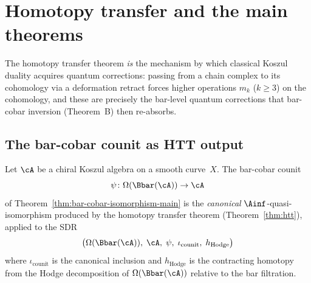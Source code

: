 \section{Homotopy transfer and the main theorems}
\label{sec:htt-main-theorems}

The homotopy transfer theorem \emph{is} the mechanism by which classical Koszul duality
acquires quantum corrections: passing from a chain complex to its cohomology via a
deformation retract forces higher operations $m_k$ ($k \geq 3$) on the cohomology,
and these are precisely the bar-level quantum corrections that bar-cobar inversion
(Theorem~B) then re-absorbs.

\subsection{The bar-cobar counit as HTT output}

\begin{theorem}
\label{thm:bar-cobar-htt}
Let $\cA$ be a chiral Koszul algebra on a smooth curve~$X$.
The bar-cobar counit
\[
\psi \colon \Omega(\Bbar(\cA)) \to \cA
\]
of Theorem~\textup{\ref{thm:bar-cobar-isomorphism-main}} is the
\emph{canonical} $\Ainf$-quasi-isomorphism produced by the homotopy
transfer theorem (Theorem~\ref{thm:htt}), applied to the SDR
\[
\bigl(\Omega(\Bbar(\cA)),\; \cA,\; \psi,\; \iota_{\mathrm{counit}},\;
h_{\mathrm{Hodge}}\bigr)
\]
where $\iota_{\mathrm{counit}}$ is the canonical inclusion and
$h_{\mathrm{Hodge}}$ is the contracting homotopy from the
Hodge decomposition of $\Omega(\Bbar(\cA))$ relative to the bar
filtration.
\end{theorem}

